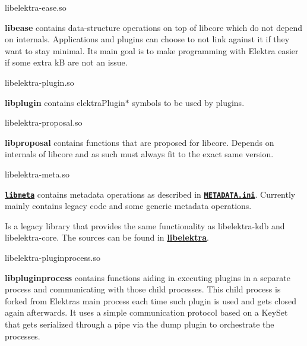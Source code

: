 \begin{DoxyCode}
libelektra-ease.so
\end{DoxyCode}


{\bfseries libease} contains data-\/structure operations on top of libcore which do not depend on internals. Applications and plugins can choose to not link against it if they want to stay minimal. Its main goal is to make programming with Elektra easier if some extra kB are not an issue.


\begin{DoxyCode}
libelektra-plugin.so
\end{DoxyCode}


{\bfseries libplugin} contains {\ttfamily elektra\+Plugin$\ast$} symbols to be used by plugins.


\begin{DoxyCode}
libelektra-proposal.so
\end{DoxyCode}


{\bfseries libproposal} contains functions that are proposed for libcore. Depends on internals of libcore and as such must always fit to the exact same version.


\begin{DoxyCode}
libelektra-meta.so
\end{DoxyCode}


{\bfseries \href{/home/jenkins/workspace/libelektra-release/src/libs/meta/meta.c}{\tt libmeta}} contains metadata operations as described in {\bfseries \href{/home/jenkins/workspace/libelektra-release/doc/METADATA.ini}{\tt M\+E\+T\+A\+D\+A\+T\+A.\+ini}}. Currently mainly contains legacy code and some generic metadata operations.

Is a legacy library that provides the same functionality as {\ttfamily libelektra-\/kdb} and {\ttfamily libelektra-\/core}. The sources can be found in {\bfseries \hyperlink{md_src_libs_elektra_README_src_libs_elektra_README_md}{libelektra}}.


\begin{DoxyCode}
libelektra-pluginprocess.so
\end{DoxyCode}


{\bfseries libpluginprocess} contains functions aiding in executing plugins in a separate process and communicating with those child processes. This child process is forked from Elektra\textquotesingle{}s main process each time such plugin is used and gets closed again afterwards. It uses a simple communication protocol based on a Key\+Set that gets serialized through a pipe via the dump plugin to orchestrate the processes.

